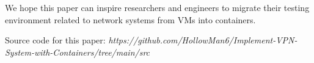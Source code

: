 \documentclass[article]{aaltoseries}
\begin{document}
We hope this paper can inspire researchers and engineers to migrate their testing environment related to network systems from VMs into containers.

Source code for this paper: \textit{https://github.com/HollowMan6/Implement-VPN-System-with-Containers/tree/main/src}

















\end{document}
